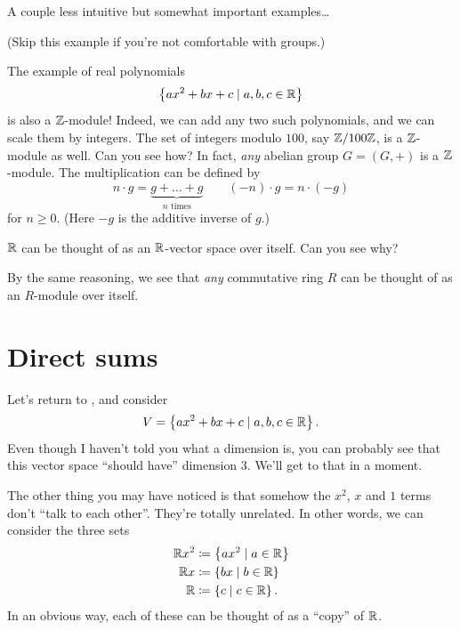 A couple less intuitive but somewhat important examples\dots
\begin{example}
	(Skip this example if you're not comfortable with groups.)
	\begin{enumerate}[(a)]
		\ii The example of real polynomials
		\[ \left\{ ax^2+bx+c \mid a,b,c \in \mathbb R \right\} \]
		is also a $\mathbb Z$-module!
		Indeed, we can add any two such polynomials,
		and we can scale them by integers.
		\ii The set of integers modulo $100$, say $\mathbb Z/100\mathbb Z$,
		is a $\mathbb Z$-module as well. Can you see how?
		\ii In fact, \emph{any} abelian group $G = (G,+)$ is a $\mathbb Z$-module.
		The multiplication can be defined by
		\[ n \cdot g = \underbrace{g+\dots+g}_{\text{$n$ times}}
		\qquad (-n) \cdot g = n \cdot (-g)\]
		for $n \ge 0$. (Here $-g$ is the additive inverse of $g$.)
	\end{enumerate}
\end{example}
\begin{example}
	\listhack
	\begin{enumerate}[(a)]
	\ii $\mathbb R$ can be thought of as an $\mathbb R$-vector space over itself.
	Can you see why?

	\ii By the same reasoning,
	we see that \emph{any} commutative ring $R$ can be thought of
	as an $R$-module over itself.
	\end{enumerate}
\end{example}

\section{Direct sums}
Let's return to , and consider
\[ V = \left\{ ax^2+bx+c \mid a,b,c \in \mathbb R \right\}.  \]
Even though I haven't told you what a dimension is,
you can probably see that this vector space ``should have'' dimension $3$.
We'll get to that in a moment.

The other thing you may have noticed is that somehow
the $x^2$, $x$ and $1$ terms don't ``talk to each other''.
They're totally unrelated.
In other words, we can consider the three sets
\begin{align*}
	\mathbb R x^2 &\coloneqq \left\{ ax^2 \mid a \in \mathbb R \right\} \\
	\mathbb R x &\coloneqq \left\{ bx \mid b \in \mathbb R \right\} \\
	\mathbb R &\coloneqq \left\{ c \mid c \in \mathbb R \right\}.
\end{align*}
In an obvious way, each of these can be thought of as a ``copy'' of $\mathbb R$.


